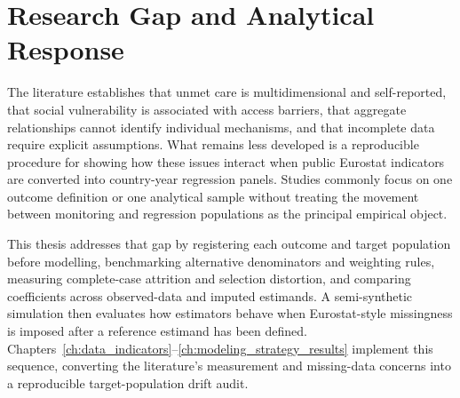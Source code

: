\section{Research Gap and Analytical Response}

The literature establishes that unmet care is multidimensional and self-reported, that social vulnerability is associated with access barriers, that aggregate relationships cannot identify individual mechanisms, and that incomplete data require explicit assumptions. What remains less developed is a reproducible procedure for showing how these issues interact when public Eurostat indicators are converted into country-year regression panels. Studies commonly focus on one outcome definition or one analytical sample without treating the movement between monitoring and regression populations as the principal empirical object.

This thesis addresses that gap by registering each outcome and target population before modelling, benchmarking alternative denominators and weighting rules, measuring complete-case attrition and selection distortion, and comparing coefficients across observed-data and imputed estimands. A semi-synthetic simulation then evaluates how estimators behave when Eurostat-style missingness is imposed after a reference estimand has been defined. Chapters~\ref{ch:data_indicators}--\ref{ch:modeling_strategy_results} implement this sequence, converting the literature's measurement and missing-data concerns into a reproducible target-population drift audit.
